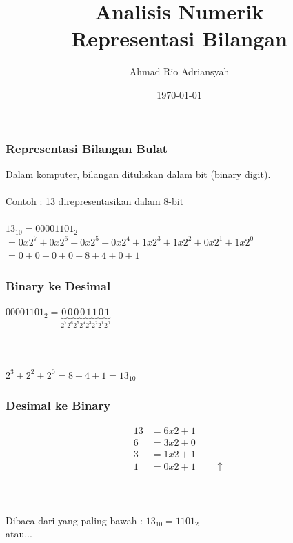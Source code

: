 \documentclass{beamer}
\title[Anum - Bilangan dan Galat]{Analisis Numerik\\Representasi Bilangan} %
\author{Ahmad Rio Adriansyah} %
\institute[STT-NF] %
{
STT Terpadu - Nurul Fikri \\ %
\medskip
\textit{ahmad.rio.adriansyah@gmail.com
\\arasy@nurulfikri.ac.id} %
}
\date{\today} %
\begin{document}
\begin{frame}
\titlepage %
\end{frame}


\begin{frame}
\frametitle{Representasi Bilangan Bulat}
Dalam komputer, bilangan dituliskan dalam bit (binary digit).
\\\ \\Contoh : 13 direpresentasikan dalam 8-bit 
\\\ \\$13_{10} = 00001101_2$ 
\\\qquad  $= 0 x 2^7 + 0 x 2^6 + 0 x 2^5 + 0 x 2^4 +
		     1 x 2^3 + 1 x 2^2 + 0 x 2^1 + 1 x 2^0$
\\\qquad  $= 0 + 0 + 0 + 0 + 8 + 4 + 0 + 1$
\end{frame}

\begin{frame}
\frametitle{Binary ke Desimal}
$00001101_2 = \underbrace{0}_{2^7}\underbrace{0}_{2^6}\underbrace{0}_{2^5}\underbrace{0}_{2^4}\underbrace{1}_{2^3}\underbrace{1}_{2^2}\underbrace{0}_{2^1}\underbrace{1}_{2^0}$
\\\ \\\ \\\ \\$2^3+2^2+2^0 = 8+4+1 = 13_{10}$
\end{frame}

\begin{frame}
\frametitle{Desimal ke Binary}
\begin{equation}
\begin{split}
13 &= 6 x 2 + 1
\\6 &= 3 x 2 + 0
\\3 &= 1 x 2 + 1 
\\1 &= 0 x 2 + 1 \qquad \uparrow
\end{split}
\nonumber
\end{equation}
\ \\\ \\\ \\Dibaca dari yang paling bawah : $13_{10} = 1101_2$
\\atau...
\end{frame}
\end{document}
